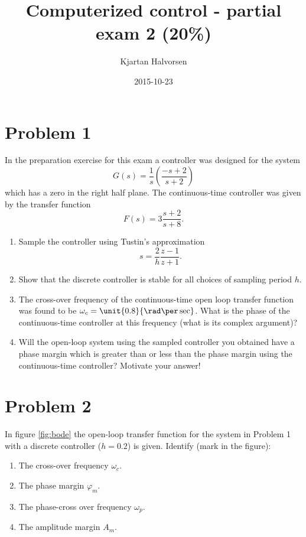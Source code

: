 \documentclass{scrartcl}
\title{Computerized control - partial exam 2 (20\%)}
\author{Kjartan Halvorsen}
\date{2015-10-23}
\newcommand{\tustin}{\ensuremath{\frac{2}{h}\frac{z-1}{z+1}}}
\begin{document}
\maketitle


\section*{Problem 1}
\label{sec-1}

  In the preparation exercise for this exam a controller was designed for the system 
  \[ G(s) = \frac{1}{s}\left(\frac{-s+2}{s+2}\right)\]
  which has a zero in the right half plane. The continuous-time controller was given by the transfer function 
  \[ F(s) = 3\frac{s+2}{s+8}. \]
\begin{enumerate}
\item Sample the controller using Tustin's approximation \[s=\tustin.\]
\item Show that the discrete controller is stable for all choices of sampling period $h$.
\item The cross-over frequency of the continuous-time open loop transfer function was found to be $\omega_c=\unit{0.8}{\rad\per\sec}$. What is the phase of the continuous-time controller at this frequency (what is its complex argument)?
\item Will the open-loop system using the sampled controller you obtained have a phase margin which is greater than or less than the phase margin using the continuous-time controller? Motivate your answer!
\end{enumerate}
\section*{Problem 2}
\label{sec-2}

  In figure \ref{fig:bode} the open-loop transfer function for the system in Problem 1 with a discrete controller ($h=0.2$) is given. Identify (mark in the figure):
\begin{enumerate}
\item The cross-over frequency $\omega_c$.
\item The phase margin $\varphi_m$.
\item The phase-cross over frequency $\omega_p$.
\item The amplitude margin $A_m$.
\end{enumerate}
\end{document}
